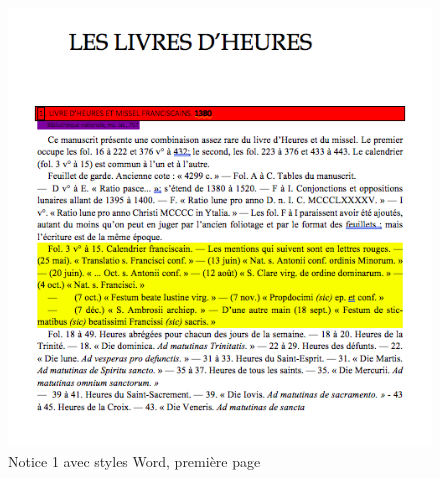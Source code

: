 \documentclass[a4paper,12pt,twoside]{book}
\begin{document}
	
	\begin{figure}[!h]
    \centering
    \includegraphics[width=15cm]{img/Doc_Sources_transformation/Docs_Word_Styles/Notice1/StylesNotice1_1.png}
    \caption{Notice 1 avec styles Word, première page}
    \end{figure}
    
\end{document}
